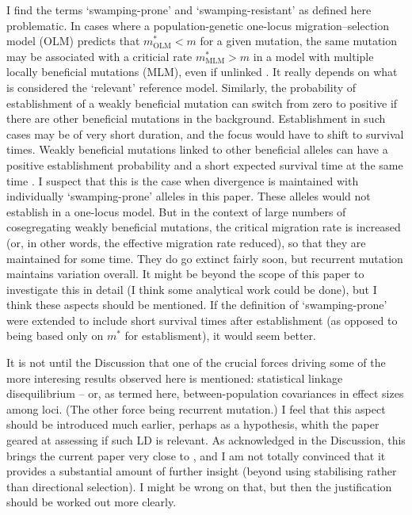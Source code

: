 \documentclass[11pt]{article}
\newenvironment{my_enumerate}
{\begin{enumerate}
  \setlength{\itemsep}{2pt}
  \setlength{\parskip}{0pt}
  \setlength{\parsep}{0pt}}
{\end{enumerate}}
\begin{document}
\begin{my_enumerate}
	\item I find the terms `swamping-prone' and `swamping-resistant' as defined here problematic. In cases where a population-genetic one-locus migration--selection model (OLM) predicts that $m^{\ast}_{\mathrm{OLM}} < m$ for a given mutation, the same mutation may be associated with a criticial rate $m^{\ast}_{\mathrm{MLM}} > m$ in a model with multiple locally beneficial mutations (MLM), even if unlinked \citep{Buerger:2011uq, Aeschbacher:2014fk}. It really depends on what is considered the `relevant' reference model. Similarly, the probability of establishment of a weakly beneficial mutation can switch from zero to positive if there are other beneficial mutations in the background. Establishment in such cases may be of very short duration, and the focus would have to shift to survival times. Weakly beneficial mutations linked to other beneficial alleles can have a positive establishment probability and a short expected survival time at the same time \citep{Aeschbacher:2014fk}. I suspect that this is the case when divergence is maintained with individually `swamping-prone' alleles in this paper. These alleles would not establish in a one-locus model. But in the context of large numbers of cosegregating weakly beneficial mutations, the critical migration rate is increased (or, in other words, the effective migration rate reduced), so that they are maintained for some time. They do go extinct fairly soon, but recurrent mutation maintains variation overall. It might be beyond the scope of this paper to investigate this in detail (I think some analytical work could be done), but I think these aspects should be mentioned. If the definition of `swamping-prone' were extended to include short survival times after establishment (as opposed to being based only on $m^{\mathrm{\ast}}$ for establisment), it would seem better.
	\item It is not until the Discussion that one of the crucial forces driving some of the more interesing results observed here is mentioned: statistical linkage disequilibrium -- or, as termed here, between-population covariances in effect sizes among loci. (The other force being recurrent mutation.) I feel that this aspect should be introduced much earlier, perhaps as a hypothesis, whith the paper geared at assessing if such LD is relevant. As acknowledged in the Discussion, this brings the current paper very close to \cite{Flaxman:2014mz}, and I am not totally convinced that it provides a substantial amount of further insight (beyond using stabilising rather than directional selection). I might be wrong on that, but then the justification should be worked out more clearly.
\end{my_enumerate}
	
\end{document}
